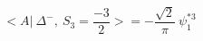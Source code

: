 \begin{equation}
<A|~\Delta^{-}, ~S_3=\frac{-3}{2} >=- \frac{\sqrt{2}}{\pi} ~\psi_1^{*3}
\end{equation}

